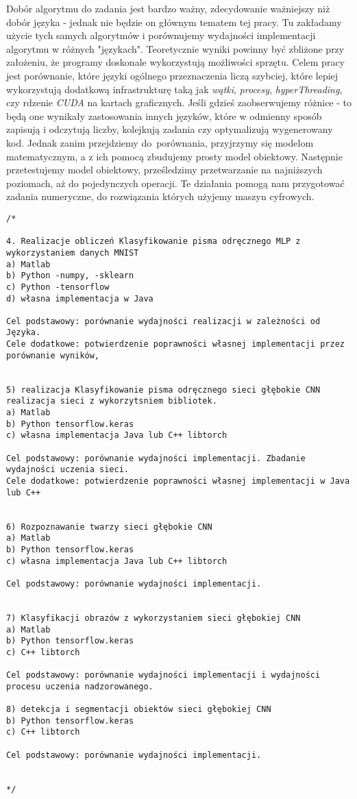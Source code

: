 Dobór algorytmu do zadania jest bardzo ważny, zdecydowanie ważniejszy niż dobór języka - jednak nie będzie on głównym tematem tej pracy. Tu zakładamy użycie tych samych algorytmów i porównujemy wydajności implementacji algorytmu w różnych "językach". Teoretycznie wyniki powinny być zbliżone przy założeniu, że programy doskonale wykorzystują możliwości sprzętu. Celem pracy jest porównanie, które języki ogólnego przeznaczenia liczą szybciej, które lepiej wykorzystują dodatkową infrastrukturę taką jak \textit{wątki}, \textit{procesy},  \textit{hyperThreading}, czy rdzenie \textit{CUDA} na kartach graficznych.
Jeśli gdzieś zaobserwujemy różnice - to będą one wynikały zastosowania innych języków, które w odmienny sposób zapisują i odczytują liczby, kolejkują zadania czy optymalizują wygenerowany kod. \newLine 
Jednak zanim przejdziemy do~porównania, przyjrzymy się modelom matematycznym, a z ich pomocą zbudujemy prosty model obiektowy. Następnie przetestujemy model obiektowy, prześledzimy przetwarzanie na najniższych poziomach, aż do pojedynczych operacji. Te działania pomogą nam przygotować zadania numeryczne, do rozwiązania których użyjemy maszyn cyfrowych.

\begin{lstlisting}
/*

4. Realizacje obliczeń Klasyfikowanie pisma odręcznego MLP z wykorzystaniem danych MNIST
a) Matlab
b) Python -numpy, -sklearn
c) Python -tensorflow
d) własna implementacja w Java

Cel podstawowy: porównanie wydajności realizacji w zależności od Języka.
Cele dodatkowe: potwierdzenie poprawności własnej implementacji przez porównanie wyników,


5) realizacja Klasyfikowanie pisma odręcznego sieci głębokie CNN realizacja sieci z wykorzytsniem bibliotek.
a) Matlab
b) Python tensorflow.keras
c) własna implementacja Java lub C++ libtorch

Cel podstawowy: porównanie wydajności implementacji. Zbadanie wydajności uczenia sieci.
Cele dodatkowe: potwierdzenie poprawności własnej implementacji w Java lub C++


6) Rozpoznawanie twarzy sieci głębokie CNN
a) Matlab
b) Python tensorflow.keras
c) własna implementacja Java lub C++ libtorch

Cel podstawowy: porównanie wydajności implementacji.


7) Klasyfikacji obrazów z wykorzystaniem sieci głębokiej CNN
a) Matlab
b) Python tensorflow.keras
c) C++ libtorch

Cel podstawowy: porównanie wydajności implementacji i wydajności procesu uczenia nadzorowanego.

8) detekcja i segmentacji obiektów sieci głębokiej CNN
b) Python tensorflow.keras
c) C++ libtorch

Cel podstawowy: porównanie wydajności implementacji.


*/
\end{lstlisting}